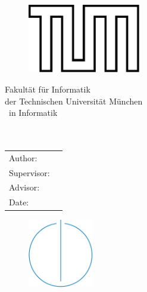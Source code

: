 \thispagestyle{empty}

\hphantom{placeholder to make vspace work}
\begin{center}
	\begin{figure}[h!]
		\centering
		\includegraphics[height=3cm]{tum.pdf}
	\end{figure}
	\vspace{0.5cm}
	{\Large{} Fakultät für Informatik}\\ 
	\vspace{0.5cm}
	{\large{} der Technischen Universität München}\\
    \vspace{2cm}
	{\Large \makeatletter\@Doctype\makeatother\ in Informatik}\\
	\vspace{1cm}
	{\sffamily\LARGE \makeatletter\@title\makeatother}\\
	\vspace{0.5cm}
	{\sffamily\LARGE \makeatletter\@germanTitle\makeatother}\\
	\vspace{1cm}
	\begin{tabular}{ll}
		\Large Author:     & \Large \makeatletter\@author\makeatother \\[2mm]
		\Large Supervisor: & \Large \makeatletter\@supervisor\makeatother \\[2mm]
		\Large Advisor:	   & \Large \makeatletter\@advisor\makeatother\\[2mm]
		\Large Date:       & \Large \makeatletter\@date\makeatother
	 \end{tabular}
	\vspace{1cm}
	\begin{figure}[h!]
		\centering
		\includegraphics[height=3cm]{in_tum.pdf}
	\end{figure}
\end{center}
\clearpage
